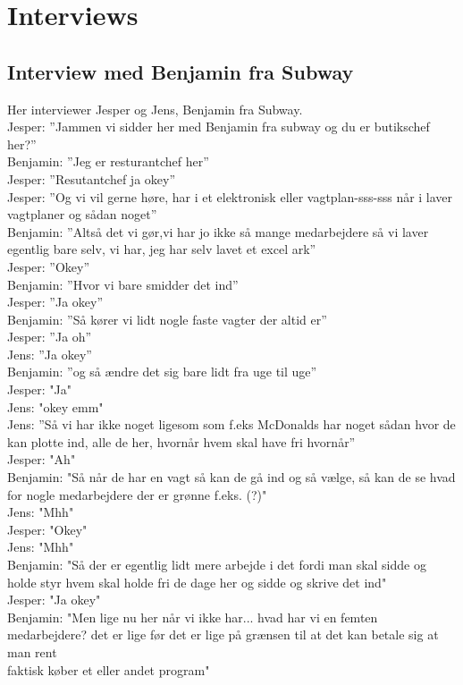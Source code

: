 \chapter{Interviews}\label{interviews}
\section{Interview med Benjamin fra Subway}\label{app:subway}
Her interviewer Jesper og Jens, Benjamin fra Subway.\\
Jesper: ”Jammen vi sidder her med Benjamin fra subway og du er butikschef her?”\\
Benjamin: ”Jeg er resturantchef her”\\
Jesper: ”Resutantchef ja okey”\\
Jesper: ”Og vi vil gerne høre, har i et elektronisk eller vagtplan-sss-sss når i laver vagtplaner og sådan noget”\\
Benjamin: ”Altså det vi gør,vi har jo ikke så mange medarbejdere så vi laver egentlig bare selv, vi har, jeg har selv lavet et excel ark”\\
Jesper: ”Okey”\\
Benjamin: ”Hvor vi bare smidder det ind”\\
Jesper: ”Ja okey”\\
Benjamin: ”Så kører vi lidt nogle faste vagter der altid er”\\
Jesper: ”Ja oh”\\
Jens: ”Ja okey”\\
Benjamin: ”og så ændre det sig bare lidt fra uge til uge”\\
Jesper: "Ja"\\
Jens: "okey emm"\\
Jens: ”Så vi har ikke noget ligesom som f.eks McDonalds har noget sådan hvor de kan plotte ind, alle de her, hvornår hvem skal have fri hvornår”\\
Jesper: "Ah"\\
Benjamin: "Så når de har en vagt så kan de gå ind og så vælge, så kan de se hvad for nogle medarbejdere der er grønne f.eks. (?)"\\
Jens: "Mhh"\\
Jesper: "Okey"\\
Jens: "Mhh"\\
Benjamin: "Så der er egentlig lidt mere arbejde i det fordi man skal sidde og holde styr hvem skal holde fri de dage her og sidde og skrive det ind"\\
Jesper: "Ja okey"\\
Benjamin: "Men lige nu her når vi ikke har... hvad har vi en femten medarbejdere? det er lige før det er lige på grænsen til at det kan betale sig at man rent\\ faktisk køber et eller andet program" \\
